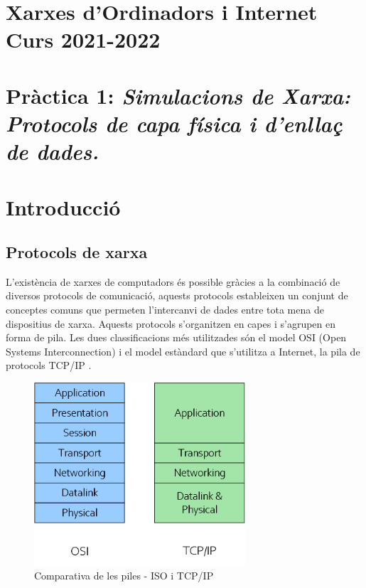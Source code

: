 \documentclass[12pt,a4paper]{article}
\begin{document}
\section*{Xarxes d’Ordinadors i Internet \\ Curs 2021-2022}
\section*{Pràctica 1: \textit{Simulacions de Xarxa: Protocols de capa física i d'enllaç de dades.}}

\vspace*{0.5cm}
\section{Introducció}


\subsection*{Protocols de xarxa}
L'existència de xarxes de computadors és possible gràcies a la combinació de diversos protocols de comunicació, aquests protocols estableixen un conjunt de conceptes comuns que permeten l'intercanvi de dades entre tota mena de dispositius de xarxa. Aquests protocols s'organitzen en capes i s'agrupen en forma de pila. Les dues classificacions més utilitzades són el model OSI (Open Systems Interconnection) \cite{osi} i el model estàndard que s'utilitza a Internet, la pila de protocols TCP/IP \cite{internet}.

\begin{figure}[!ht]
  \begin{center}
    \includegraphics[width=0.7\textwidth]{protocol-stack}
    \caption{Comparativa de les piles - ISO i TCP/IP}
    \label{osi-stack}
  \end{center}
\end{figure}
\end{document}
